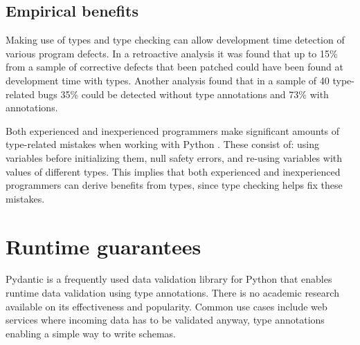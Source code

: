 \subsection{Empirical benefits}

Making use of types and type checking can allow development time detection of various program defects. In a retroactive analysis it was found that up to 15\% from a sample of corrective defects that been patched could have been found at development time with types\cite{khan_empirical_2022}. Another analysis \cite{xu_how_well_static_2023} found that in a sample of 40 type-related bugs 35\% could be detected without type annotations and 73\% with annotations.


Both experienced and inexperienced programmers make significant amounts of type-related mistakes when working with Python \cite{khan_empirical_2022}. These consist of: using variables before initializing them, null safety errors, and re-using variables with values of different types. This implies that both experienced and inexperienced programmers can derive benefits from types, since type checking helps fix these mistakes.

\section{Runtime guarantees}

Pydantic is a frequently used data validation library for Python that enables runtime data validation using type annotations\cite{pydanticdev_welcome_nodate}. There is no academic research available on its effectiveness and popularity. Common use cases include web services where incoming data has to be validated anyway, type annotations enabling a simple way to write schemas.

